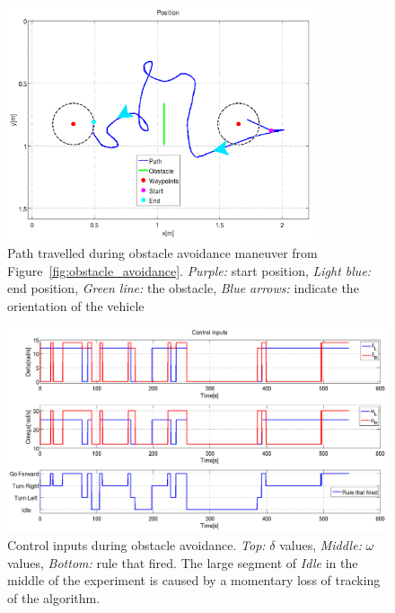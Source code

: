 \begin{figure}
\centering
\includegraphics[width=0.8\textwidth]{Files/Figures/oavoidance_2016-05-09_12-04-15-position.png}
\caption[Path travelled during obstacle avoidance]{Path travelled during obstacle avoidance maneuver from Figure~\ref{fig:obstacle_avoidance}. \textit{Purple:} start position, \textit{Light blue:} end position, \textit{Green line:} the obstacle, \textit{Blue arrows:} indicate the orientation of the vehicle}
\label{fig:obstacle_avoidance_path}
\end{figure}

\begin{figure}
\centering
\includegraphics[width=\textwidth]{Files/Figures/oavoidance_2016-05-09_12-04-15-control-inputs.png}
\caption[Control inputs during obstacle avoidance]{Control inputs during obstacle avoidance. \textit{Top:} $\delta$ values, \textit{Middle:} $\omega$ values, \textit{Bottom:} rule that fired. The large segment of \textit{Idle} in the middle of the experiment is caused by a momentary loss of tracking of the algorithm.}
\label{fig:obstacle_avoidance_control_input}
\end{figure}

